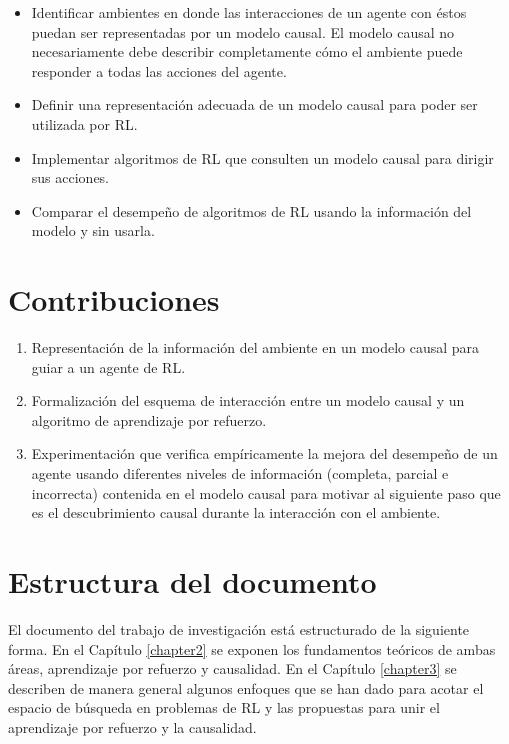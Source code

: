 \begin{itemize}
    \item Identificar ambientes en donde 
    las interacciones de un agente con éstos puedan ser representadas por un modelo causal.
    El modelo causal no necesariamente debe
    describir completamente cómo el ambiente puede responder a todas las acciones del agente.
    \item Definir una representación adecuada
    de un modelo causal para poder ser utilizada 
    por RL.
    \item Implementar algoritmos de RL que consulten un modelo causal para dirigir sus acciones.
    \item Comparar el desempeño de algoritmos
    de RL usando la información del modelo y 
    sin usarla. 
\end{itemize}


\section{Contribuciones}


\begin{enumerate}
    \item Representación de la información del ambiente
    en un modelo causal para guiar a un agente de RL.
    \item 
    Formalización del esquema 
    de interacción entre
    un modelo causal y un algoritmo de aprendizaje por
    refuerzo.
    \item Experimentación que verifica empíricamente
    la mejora del desempeño de un agente usando diferentes niveles de información (completa, parcial e incorrecta) contenida en el modelo causal para motivar al siguiente paso 
    que es el descubrimiento causal durante la interacción con el
    ambiente.
\end{enumerate}

\section{Estructura del documento}

El documento del trabajo de investigación está estructurado de la 
siguiente forma.
En el Capítulo \ref{chapter2} se exponen los fundamentos teóricos de ambas áreas, aprendizaje por refuerzo y causalidad.
En el Capítulo \ref{chapter3} se describen de manera general algunos enfoques
que se han dado para acotar el espacio de búsqueda en problemas
de RL y las propuestas para unir el aprendizaje por refuerzo y
la causalidad.
